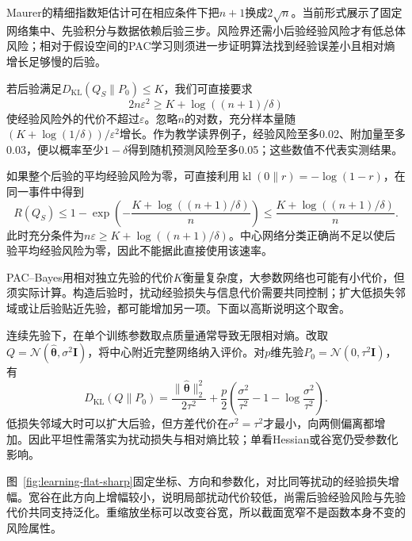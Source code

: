Maurer的精细指数矩估计可在相应条件下把$n+1$换成$2\sqrt n$。当前形式展示了固定网络集中、先验积分与数据依赖后验三步。风险界还需小后验经验风险才有低总体风险；相对于假设空间的PAC学习则须进一步证明算法找到经验误差小且相对熵增长足够慢的后验。

若后验满足$D_{\mathrm{KL}}(Q_S\|P_0)\leq K$，我们可直接要求
\begin{equation}
 2n\varepsilon^2\geq K+\log((n+1)/\delta)
 \label{eq:pac-bayes-sample-requirement}
\end{equation}
使经验风险外的代价不超过$\varepsilon$。忽略$n$的对数，充分样本量随$(K+\log(1/\delta))/\varepsilon^2$增长。作为教学读界例子，经验风险至多0.02、附加量至多0.03，便以概率至少$1-\delta$得到随机预测风险至多0.05；这些数值不代表实测结果。

如果整个后验的平均经验风险为零，可直接利用$\operatorname{kl}(0\|r)=-\log(1-r)$，在同一事件中得到
\[
 R(Q_S)\leq1-\exp\left(-\frac{K+\log((n+1)/\delta)}n\right)
 \leq\frac{K+\log((n+1)/\delta)}n.
\]
此时充分条件为$n\varepsilon\geq K+\log((n+1)/\delta)$。中心网络分类正确尚不足以使后验平均经验风险为零，因此不能据此直接使用该速率。

PAC--Bayes用相对独立先验的代价$K$衡量复杂度，大参数网络也可能有小代价，但须实际计算。构造后验时，扰动经验损失与信息代价需要共同控制；扩大低损失邻域或让后验贴近先验，都可能增加另一项。下面以高斯说明这个取舍。

连续先验下，在单个训练参数取点质量通常导致无限相对熵。改取$Q=\mathcal N(\hat{\bm\theta},\sigma^2\bm I)$，将中心附近完整网络纳入评价。对$p$维先验$P_0=\mathcal N(0,\tau^2\bm I)$，有
\begin{equation}
 D_{\mathrm{KL}}(Q\|P_0)=\frac{\|\hat{\bm\theta}\|_2^2}{2\tau^2}
 +\frac p2\left(\frac{\sigma^2}{\tau^2}-1-\log\frac{\sigma^2}{\tau^2}\right).
 \label{eq:gaussian-pac-bayes-kl}
\end{equation}
低损失邻域大时可以扩大后验，但方差代价在$\sigma^2=\tau^2$才最小，向两侧偏离都增加。因此平坦性需落实为扰动损失与相对熵比较；单看Hessian或谷宽仍受参数化影响。

图~\ref{fig:learning-flat-sharp}固定坐标、方向和参数化，对比同等扰动的经验损失增幅。宽谷在此方向上增幅较小，说明局部扰动代价较低，尚需后验经验风险与先验代价共同支持泛化。重缩放坐标可以改变谷宽，所以截面宽窄不是函数本身不变的风险属性。

